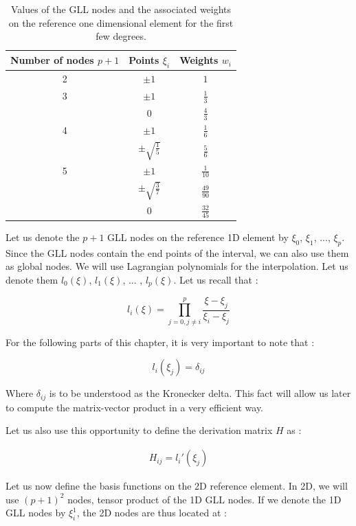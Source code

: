 \begin{table}
\centering
\begin{tabular}{c|cc}
\hline
 Number of nodes $p+1$ & Points $\xi_i$ & Weights $w_i$\\
 \hline
 2 & $\pm 1$ & $1$ \\
 \hline
 3 & $\pm 1$ & $\frac{1}{3}$\\
    & 0			   & $\frac{4}{3}$\\
 \hline
 4 & $\pm 1$ & $\frac{1}{6}$\\
    & $\pm \sqrt{\frac{1}{5}}$  & $\frac{5}{6}$\\
\hline
5 & $\pm 1$ & $\frac{1}{10}$\\
   & $\pm \sqrt{\frac{3}{7}}$ & $\frac{49}{90}$\\
   & $0$ & $\frac{32}{45}$\\
   \hline
\end{tabular}
\caption{Values of the GLL nodes and the associated weights on the reference one dimensional element for the first few degrees.}
\label{gll_values}
\end{table}

Let us denote the $p+1$ GLL nodes on the reference 1D element by $\xi_0$, $\xi_1$, ..., $\xi_p$. Since the GLL nodes contain the end points of the interval, we can also use them as global nodes. We will use Lagrangian polynomials for the interpolation. Let us denote them $l_0(\xi)$, $l_1(\xi)$, ... , $l_p(\xi)$. Let us recall that : 

$$ l_i(\xi) = \prod_{j=0 , j\neq i}^p \frac{\xi - \xi_j}{\xi_i  - \xi_j}$$

For the following parts of this chapter, it is very important to note that :

$$ l_i(\xi_j) = \delta_{ij} $$ 

Where $\delta_{ij}$ is to be understood as the Kronecker delta. This fact will allow us later to compute the matrix-vector product in a very efficient way. 

Let us also use this opportunity to define the derivation matrix $H$ as : 

\begin{align}
H_{ij} = l_i'(\xi_j) \label{eq:derivation_matrix}
\end{align}

Let us now define the basis functions on the 2D reference element. In 2D, we will use $(p+1)^2$ nodes, tensor product of the 1D GLL nodes. If we denote the 1D GLL nodes by $\xi_i^1$, the 2D nodes are thus located at :

